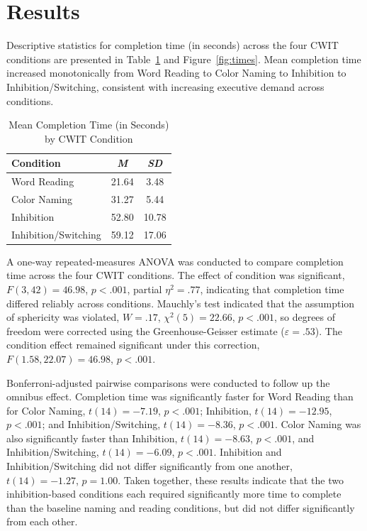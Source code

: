 \documentclass[stu,floatsintext]{apa7}
\begin{document}
\section{Results}

Descriptive statistics for completion time (in seconds) across the four CWIT conditions are presented in Table~\ref{tab:times} and Figure~\ref{fig:times}. Mean completion time increased monotonically from Word Reading to Color Naming to Inhibition to Inhibition/Switching, consistent with increasing executive demand across conditions.

\begin{table}[htbp]
  \centering
  \caption{Mean Completion Time (in Seconds) by CWIT Condition}
  \label{tab:times}
  \begin{tabular}{lcc}
    \toprule
    Condition & \textit{M} & \textit{SD} \\
    \midrule
    Word Reading         & 21.64 &  3.48 \\
    Color Naming         & 31.27 &  5.44 \\
    Inhibition           & 52.80 & 10.78 \\
    Inhibition/Switching & 59.12 & 17.06 \\
    \bottomrule
  \end{tabular}
\end{table}

A one-way repeated-measures ANOVA was conducted to compare completion time across the four CWIT conditions. The effect of condition was significant, $F(3, 42) = 46.98$, $p < .001$, partial $\eta^2 = .77$, indicating that completion time differed reliably across conditions. Mauchly's test indicated that the assumption of sphericity was violated, $W = .17$, $\chi^2(5) = 22.66$, $p < .001$, so degrees of freedom were corrected using the Greenhouse-Geisser estimate ($\varepsilon = .53$). The condition effect remained significant under this correction, $F(1.58, 22.07) = 46.98$, $p < .001$.

Bonferroni-adjusted pairwise comparisons were conducted to follow up the omnibus effect. Completion time was significantly faster for Word Reading than for Color Naming, $t(14) = -7.19$, $p < .001$; Inhibition, $t(14) = -12.95$, $p < .001$; and Inhibition/Switching, $t(14) = -8.36$, $p < .001$. Color Naming was also significantly faster than Inhibition, $t(14) = -8.63$, $p < .001$, and Inhibition/Switching, $t(14) = -6.09$, $p < .001$. Inhibition and Inhibition/Switching did not differ significantly from one another, $t(14) = -1.27$, $p = 1.00$. Taken together, these results indicate that the two inhibition-based conditions each required significantly more time to complete than the baseline naming and reading conditions, but did not differ significantly from each other.
\end{document}
